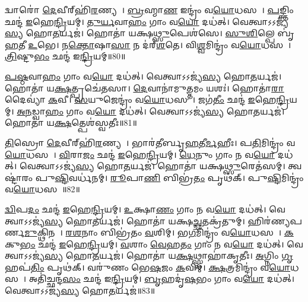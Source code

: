 𑌦𑍍𑌵𑌾𑌰𑍋॑ \ul{𑌦𑍇}𑌵𑍀𑌰𑍍‌\mbox{}𑌹𑌿॑\ul{𑌰}𑌣𑍍𑌯𑌯𑍀𑌃᳚।
\ul{𑌬𑍍𑌰}𑌹𑍍𑌮𑌾\ul{𑌣} 𑌇𑌨𑍍𑌦𑍍𑌰𑌂॑ 𑌵\ul{𑌯𑍋}𑌧𑌸𑌮𑍍᳚।
\ul{𑌪}𑌙𑍍𑌕𑍍𑌤𑌿𑌂 𑌛𑌨𑍍𑌦॑ \ul{𑌇}𑌹𑍇\ul{𑌨𑍍𑌦𑍍𑌰𑌿}𑌯𑌮𑍍।
\ul{𑌤𑍁}\ul{𑌰𑍍𑌯}𑌵𑌾\ul{𑌹𑌂} 𑌗𑌾𑌂 𑌵\ul{𑌯𑍋} 𑌦𑌧॑𑌤𑍍।
𑌵𑍇𑌤𑍍𑌵𑌾𑌽𑌽𑌜𑍍𑌯॑\ul{𑌸𑍍𑌯} 𑌹𑍋\ul{𑌤}𑌰𑍍𑌯𑌜॑।
𑌹𑍋𑌤𑌾॑ 𑌯𑌕𑍍𑌷\ul{𑌥𑍍𑌸𑍁}𑌪𑍇𑌶॑𑌸𑍇।
\ul{𑌸𑍁}\ul{𑌶𑌿}𑌲𑍍𑌪𑍇 𑌬𑍃॑\ul{𑌹}𑌤𑍀 \ul{𑌉}𑌭𑍇।
𑌨\ul{𑌕𑍍𑌤𑍋}𑌷𑌾\ul{𑌸𑌾} 𑌨 𑌦॑𑌰𑍍‌\mbox{}\ul{𑌶}𑌤𑍇।
𑌵𑌿\ul{𑌶𑍍𑌵}𑌮𑌿𑌨𑍍𑌦𑍍𑌰𑌂॑ 𑌵\ul{𑌯𑍋}𑌧𑌸𑌮𑍍᳚।
\ul{𑌤𑍍𑌰𑌿}𑌷𑍍𑌟𑍁\ul{𑌭𑌂} 𑌛𑌨𑍍𑌦॑ 𑌇\ul{𑌨𑍍𑌦𑍍𑌰𑌿}𑌯𑌮𑍍॥80॥

\ul{𑌪}\ul{𑌷𑍍𑌠}𑌵𑌾\ul{𑌹𑌂} 𑌗𑌾𑌂 𑌵\ul{𑌯𑍋} 𑌦𑌧॑𑌤𑍍।
𑌵𑍇𑌤𑍍𑌵𑌾𑌽𑌽𑌜𑍍𑌯॑\ul{𑌸𑍍𑌯} 𑌹𑍋\ul{𑌤}𑌰𑍍𑌯𑌜॑।
𑌹𑍋𑌤𑌾॑ 𑌯\ul{𑌕𑍍𑌷}𑌤𑍍𑌪𑍍𑌰𑌚𑍇॑𑌤𑌸𑌾।
\ul{𑌦𑍇}𑌵𑌾𑌨𑌾॑𑌮𑍁\ul{𑌤𑍍𑌤}𑌮𑌂 𑌯𑌶𑌃॑।
𑌹𑍋𑌤𑌾॑\ul{𑌰𑌾} 𑌦𑍈𑌵𑍍𑌯𑌾॑ \ul{𑌕}𑌵𑍀।
\ul{𑌸}𑌯𑍁𑌜𑍇𑌨𑍍𑌦𑍍𑌰𑌂॑ 𑌵\ul{𑌯𑍋}𑌧𑌸𑌮𑍍᳚।
𑌜𑌗॑\ul{𑌤𑍀𑌂} 𑌛𑌨𑍍𑌦॑ \ul{𑌇}𑌹𑍇\ul{𑌨𑍍𑌦𑍍𑌰𑌿}𑌯𑌮𑍍।
\ul{𑌅}\ul{𑌨}𑌡𑍍𑌵𑌾\ul{𑌹𑌂} 𑌗𑌾𑌂 𑌵\ul{𑌯𑍋} 𑌦𑌧॑𑌤𑍍।
𑌵𑍇𑌤𑍍𑌵𑌾𑌽𑌽𑌜𑍍𑌯॑\ul{𑌸𑍍𑌯} 𑌹𑍋\ul{𑌤}𑌰𑍍𑌯𑌜॑।
𑌹𑍋𑌤𑌾॑ 𑌯\ul{𑌕𑍍𑌷}𑌤𑍍𑌪𑍇𑌶॑𑌸𑍍𑌵𑌤𑍀𑌃॥81॥

\ul{𑌤𑌿}𑌸𑍍𑌰𑍋 \ul{𑌦𑍇}𑌵𑍀𑌰𑍍‌\mbox{}𑌹𑌿॑\ul{𑌰}𑌣𑍍𑌯𑌯𑍀𑌃᳚।
𑌭𑌾𑌰॑𑌤𑍀𑌰𑍍𑌬𑍃\ul{𑌹}𑌤𑍀\ul{𑌰𑍍𑌮}𑌹𑍀𑌃।
𑌪\ul{𑌤𑌿}𑌮𑌿𑌨𑍍𑌦𑍍𑌰𑌂॑ 𑌵\ul{𑌯𑍋}𑌧𑌸𑌮𑍍᳚।
\ul{𑌵𑌿}𑌰𑌾\ul{𑌜𑌂} 𑌛𑌨𑍍𑌦॑ \ul{𑌇}𑌹𑍇\ul{𑌨𑍍𑌦𑍍𑌰𑌿}𑌯𑌮𑍍।
\ul{𑌧𑍇}𑌨𑍁𑌂 𑌗𑌾𑌂 𑌨 𑌵\ul{𑌯𑍋} 𑌦𑌧॑𑌤𑍍।
𑌵𑍇𑌤𑍍𑌵𑌾𑌽𑌽𑌜𑍍𑌯॑\ul{𑌸𑍍𑌯} 𑌹𑍋\ul{𑌤}𑌰𑍍𑌯𑌜॑।
𑌹𑍋𑌤𑌾॑ 𑌯𑌕𑍍𑌷\ul{𑌥𑍍𑌸𑍁}𑌰𑍇𑌤॑𑌸𑌮𑍍।
𑌤𑍍𑌵𑌷𑍍𑌟𑌾॑𑌰𑌂 𑌪𑍁\ul{𑌷𑍍𑌟𑌿}𑌵𑌰𑍍𑌧॑𑌨𑌮𑍍।
\ul{𑌰𑍂}𑌪𑌾\ul{𑌣𑌿} 𑌬𑌿𑌭𑍍𑌰॑\ul{𑌤𑌂} 𑌪𑍃𑌥॑𑌕𑍍।
𑌪𑍁\ul{𑌷𑍍𑌟𑌿}𑌮𑌿𑌨𑍍𑌦𑍍𑌰𑌂॑ 𑌵\ul{𑌯𑍋}𑌧𑌸𑌮𑍍᳚॥82॥

\ul{𑌦𑍍𑌵𑌿}𑌪\ul{𑌦𑌂} 𑌛𑌨𑍍𑌦॑ \ul{𑌇}𑌹𑍇\ul{𑌨𑍍𑌦𑍍𑌰𑌿}𑌯𑌮𑍍।
\ul{𑌉}𑌕𑍍𑌷𑌾\ul{𑌣𑌂} 𑌗𑌾𑌂 𑌨 𑌵\ul{𑌯𑍋} 𑌦𑌧॑𑌤𑍍।
𑌵𑍇𑌤𑍍𑌵𑌾𑌽𑌽𑌜𑍍𑌯॑\ul{𑌸𑍍𑌯} 𑌹𑍋\ul{𑌤}𑌰𑍍𑌯𑌜॑।
𑌹𑍋𑌤𑌾॑ 𑌯𑌕𑍍𑌷\ul{𑌚𑍍𑌛}𑌤𑌕𑍍𑌰॑𑌤𑍁𑌮𑍍।
𑌹𑌿𑌰॑𑌣𑍍𑌯\-𑌪𑌰𑍍𑌣\ul{𑌮𑍁}𑌕𑍍𑌥𑌿𑌨𑌮𑍍᳚।
\ul{𑌰}\ul{𑌶}𑌨𑌾𑌂 𑌬𑌿𑌭𑍍𑌰॑𑌤𑌂 \ul{𑌵}𑌶𑌿𑌮𑍍।
𑌭\ul{𑌗}𑌮𑌿𑌨𑍍𑌦𑍍𑌰𑌂॑ 𑌵\ul{𑌯𑍋}𑌧𑌸𑌮𑍍᳚।
\ul{𑌕}𑌕𑍁\ul{𑌭𑌂} 𑌛𑌨𑍍𑌦॑ \ul{𑌇}𑌹𑍇\ul{𑌨𑍍𑌦𑍍𑌰𑌿}𑌯𑌮𑍍।
\ul{𑌵}𑌶𑌾𑌂 \ul{𑌵𑍇}𑌹\ul{𑌤𑌂} 𑌗𑌾𑌂 𑌨 𑌵\ul{𑌯𑍋} 𑌦𑌧॑𑌤𑍍।
𑌵𑍇𑌤𑍍𑌵𑌾𑌽𑌽𑌜𑍍𑌯॑\ul{𑌸𑍍𑌯} 𑌹𑍋\ul{𑌤}𑌰𑍍𑌯𑌜॑।
𑌹𑍋𑌤𑌾॑ 𑌯\ul{𑌕𑍍𑌷}𑌥𑍍𑌸𑍍𑌵𑌾𑌹𑌾॑𑌕𑍃𑌤𑍀𑌃।
\ul{𑌅}𑌗𑍍𑌨𑌿𑌂 \ul{𑌗𑍃}𑌹𑌪॑\ul{𑌤𑌿𑌂} 𑌪𑍃𑌥॑𑌕𑍍।
𑌵𑌰𑍁॑𑌣𑌂 𑌭𑍇\ul{𑌷}𑌜𑌂 \ul{𑌕}𑌵𑌿𑌮𑍍।
\ul{𑌕𑍍𑌷}𑌤𑍍𑌰𑌮𑌿𑌨𑍍𑌦𑍍𑌰𑌂॑ 𑌵\ul{𑌯𑍋}𑌧𑌸𑌮𑍍᳚।
𑌅𑌤𑌿॑𑌚𑍍𑌛𑌨𑍍𑌦\ul{𑌸𑌂} 𑌛𑌨𑍍𑌦॑ 𑌇\ul{𑌨𑍍𑌦𑍍𑌰𑌿}𑌯𑌮𑍍।
\ul{𑌬𑍃}𑌹𑌦𑍃॑\ul{𑌷}𑌭𑌂 𑌗𑌾𑌂 𑌵\ul{𑌯𑍋} 𑌦𑌧॑𑌤𑍍।
𑌵𑍇𑌤𑍍𑌵𑌾𑌽𑌽𑌜𑍍𑌯॑\ul{𑌸𑍍𑌯} 𑌹𑍋\ul{𑌤}𑌰𑍍𑌯𑌜॑॥83॥


